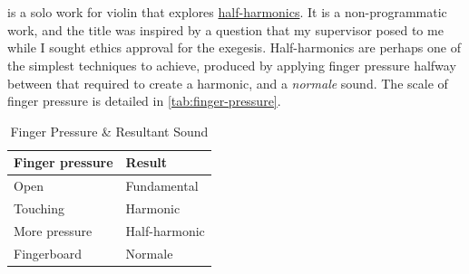 
\section{\violinPiece}\label{sec:violinPiece}
\hyperref[app:violinPiece Score]{\violinPiece} is a solo work for violin that explores \hyperref[sec:halfHarmonicsDiscussion]{half-harmonics}.
It is a non-programmatic work, and the title was inspired by a question that my supervisor posed to me while I sought ethics approval for the exegesis.
Half-harmonics are perhaps one of the simplest techniques to achieve, produced by applying finger pressure halfway between that required to create a harmonic, and a \emph{normale} sound.
The scale of finger pressure is detailed in \autoref{tab:finger-pressure}.
\begin{table}[]
    \centering
    \caption{Finger Pressure \& Resultant Sound}\label{tab:finger-pressure}
    \begin{tabular}{@{}ll@{}}
    \toprule
    Finger pressure & Result        \\ \midrule
    Open            & Fundamental   \\
    Touching        & Harmonic      \\
    More pressure   & Half-harmonic \\
    Fingerboard     & Normale       \\ \bottomrule
    \end{tabular}%
    \end{table}


